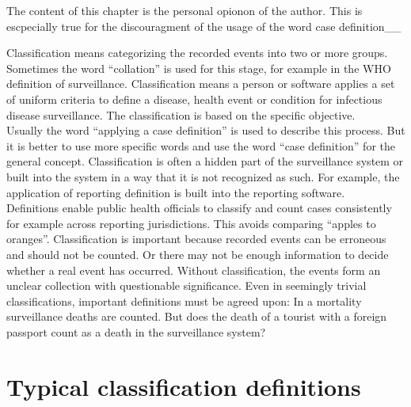 \documentclass[
  letterpaper,
  DIV=11,
  numbers=noendperiod]{scrreprt}
\begin{document}
\begin{tcolorbox}[enhanced jigsaw, opacitybacktitle=0.6, titlerule=0mm, breakable, bottomrule=.15mm, colframe=quarto-callout-warning-color-frame, toprule=.15mm, left=2mm, colbacktitle=quarto-callout-warning-color!10!white, coltitle=black, colback=white, bottomtitle=1mm, rightrule=.15mm, toptitle=1mm, title=\textcolor{quarto-callout-warning-color}{\faExclamationTriangle}\hspace{0.5em}{Warning}, opacityback=0, arc=.35mm, leftrule=.75mm]

The content of this chapter is the personal opionon of the author. This
is escpecially true for the discouragment of the usage of the word case
definition\_\_

\end{tcolorbox}

Classification means categorizing the recorded events into two or more
groups. Sometimes the word ``collation'' is used for this stage, for
example in the WHO definition of surveillance. Classification means a
person or software applies a set of uniform criteria to define a
disease, health event or condition for infectious disease surveillance.
The classification is based on the specific objective.\\
Usually the word ``applying a case definition'' is used to describe this
process. But it is better to use more specific words and use the word
``case definition'' for the general concept. Classification is often a
hidden part of the surveillance system or built into the system in a way
that it is not recognized as such. For example, the application of
reporting definition is built into the reporting software.\\
Definitions enable public health officials to classify and count cases
consistently for example across reporting jurisdictions. This avoids
comparing ``apples to oranges''. Classification is important because
recorded events can be erroneous and should not be counted. Or there may
not be enough information to decide whether a real event has occurred.
Without classification, the events form an unclear collection with
questionable significance. Even in seemingly trivial classifications,
important definitions must be agreed upon: In a mortality surveillance
deaths are counted. But does the death of a tourist with a foreign
passport count as a death in the surveillance system?

\section{Typical classification
definitions}\label{typical-classification-definitions}
\end{document}

